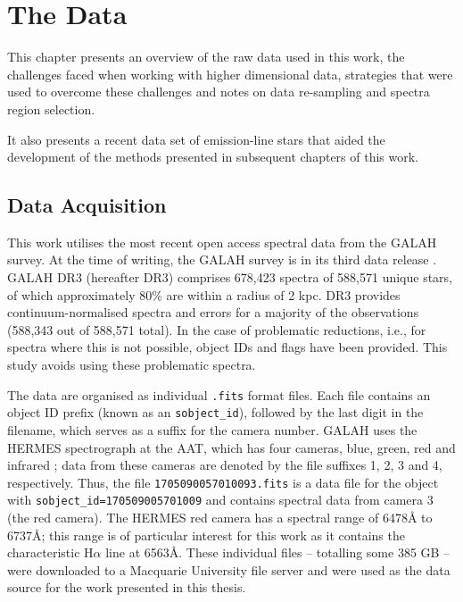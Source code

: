 \chapter{The Data}

This chapter presents an overview of the raw data used in this work, the challenges faced when working with higher dimensional data, strategies that were used to overcome these challenges and notes on data re-sampling and spectra region selection. 

It also presents a recent data set of emission-line stars that aided the development of the methods presented in subsequent chapters of this work.

\section{Data Acquisition}

This work utilises the most recent open access spectral data from the GALAH survey. At the time of writing, the GALAH survey is in its third data release \citep[GALAH DR3;][]{buder2021galah+}. GALAH DR3 (hereafter DR3) comprises  678,423 spectra of 588,571 unique stars, of which approximately 80\% are within a radius of 2 kpc. DR3 provides continuum-normalised spectra and errors for a majority of the observations (588,343 out of 588,571 total). In the case of problematic reductions, i.e., for spectra where this is not possible, object IDs and flags have been provided. This study avoids using these problematic spectra.

The data are organised as individual \texttt{.fits} format files. Each file contains an object ID prefix (known as an \texttt{sobject\_id}), followed by the last digit in the filename, which serves as a suffix for the camera number. GALAH uses the HERMES spectrograph at the AAT, which has four cameras, 
blue, green, red and infrared \citep{sheinis2014first}; data from these cameras  are denoted by the file suffixes 1, 2, 3 and 4, respectively. Thus, the file \texttt{1705090057010093.fits} is a data file for the object with \texttt{sobject\_id=170509005701009} and contains spectral data from camera 3 (the red camera). 
The HERMES red camera has a spectral range of 6478\r{A} to 6737\r{A}; this range is of particular interest for this work as it contains the characteristic H$\alpha$ line at 6563\r{A}.
These individual files -- totalling some 385 GB -- were downloaded to a Macquarie University file server and were used as the data source for the work presented in this thesis.


